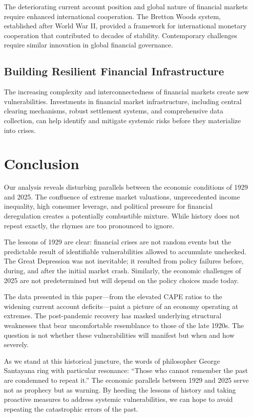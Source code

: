 \documentclass[12pt,letterpaper]{article}
\begin{document}
The deteriorating current account position and global nature of financial markets require enhanced international cooperation. The Bretton Woods system, established after World War II, provided a framework for international monetary cooperation that contributed to decades of stability. Contemporary challenges require similar innovation in global financial governance.

\subsection{Building Resilient Financial Infrastructure}

The increasing complexity and interconnectedness of financial markets create new vulnerabilities. Investments in financial market infrastructure, including central clearing mechanisms, robust settlement systems, and comprehensive data collection, can help identify and mitigate systemic risks before they materialize into crises.

\section{Conclusion}

Our analysis reveals disturbing parallels between the economic conditions of 1929 and 2025. The confluence of extreme market valuations, unprecedented income inequality, high consumer leverage, and political pressure for financial deregulation creates a potentially combustible mixture. While history does not repeat exactly, the rhymes are too pronounced to ignore.

The lessons of 1929 are clear: financial crises are not random events but the predictable result of identifiable vulnerabilities allowed to accumulate unchecked. The Great Depression was not inevitable; it resulted from policy failures before, during, and after the initial market crash. Similarly, the economic challenges of 2025 are not predetermined but will depend on the policy choices made today.

The data presented in this paper—from the elevated CAPE ratios to the widening current account deficits—paint a picture of an economy operating at extremes. The post-pandemic recovery has masked underlying structural weaknesses that bear uncomfortable resemblance to those of the late 1920s. The question is not whether these vulnerabilities will manifest but when and how severely.

As we stand at this historical juncture, the words of philosopher George Santayana ring with particular resonance: ``Those who cannot remember the past are condemned to repeat it.'' The economic parallels between 1929 and 2025 serve not as prophecy but as warning. By heeding the lessons of history and taking proactive measures to address systemic vulnerabilities, we can hope to avoid repeating the catastrophic errors of the past.
\end{document}

